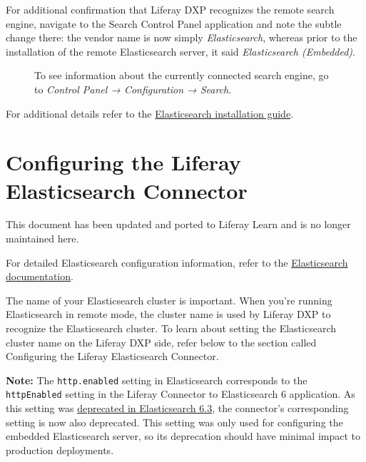 For additional confirmation that Liferay DXP recognizes the remote
search engine, navigate to the Search Control Panel application and note
the subtle change there: the vendor name is now simply
\emph{Elasticsearch}, whereas prior to the installation of the remote
Elasticsearch server, it said \emph{Elasticsearch (Embedded)}.

\begin{figure}
\centering
{}
\caption{To see information about the currently connected search engine,
go to \emph{Control Panel → Configuration → Search}.}
\end{figure}

For additional details refer to the
\href{https://www.elastic.co/guide/en/elasticsearch/reference/7.x/getting-started-install.html}{Elasticsearch
installation guide}.

\chapter{Configuring the Liferay Elasticsearch
Connector}\label{configuring-the-liferay-elasticsearch-connector}

{This document has been updated and ported to Liferay Learn and is no
longer maintained here.}

For detailed Elasticsearch configuration information, refer to the
\href{https://www.elastic.co/guide/en/elasticsearch/reference/7.x/settings.html}{Elasticsearch
documentation}.

The name of your Elasticsearch cluster is important. When you're running
Elasticsearch in remote mode, the cluster name is used by Liferay DXP to
recognize the Elasticsearch cluster. To learn about setting the
Elasticsearch cluster name on the Liferay DXP side, refer below to the
section called Configuring the Liferay Elasticsearch Connector.

\noindent\hrulefill

\textbf{Note:} The \texttt{http.enabled} setting in Elasticsearch
corresponds to the \texttt{httpEnabled} setting in the Liferay Connector
to Elasticsearch 6 application. As this setting was
\href{https://www.elastic.co/guide/en/elasticsearch/reference/6.5/release-notes-6.3.0.html}{deprecated
in Elasticsearch 6.3}, the connector's corresponding setting is now also
deprecated. This setting was only used for configuring the embedded
Elasticsearch server, so its deprecation should have minimal impact to
production deployments.

